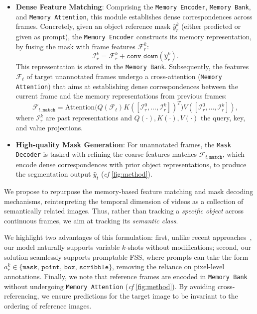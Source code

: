 \begin{itemize}[leftmargin=*,topsep=1pt]
    \item \textbf{Dense Feature Matching}: Comprising the \texttt{Memory Encoder}, \texttt{Memory Bank}, and \texttt{Memory Attention}, this module establishes dense correspondences across frames. Concretely, given an object reference mask $\hat{y}_r^k$ (either predicted or given as prompt), the \texttt{Memory Encoder} constructs its memory representation, by fusing the mask with frame features $\mathcal{F}_r^k$:
\begin{equation}
    \mathcal{I}_r^k = \mathcal{F}_r^k + \texttt{conv\_down}(\hat{y}_r^k).
    \label{eq:mem_representation}
\end{equation}
This representation is stored in the \texttt{Memory Bank}. Subsequently, the features $\mathcal{F}_t$ of target unannotated frames undergo a cross-attention (\texttt{Memory Attention}) that aims at establishing dense correspondences between the current frame and the memory representations from previous frames:
\begin{equation}
\label{eq:mem_att}
\mathcal{F}_{t, \texttt{match}} = \text{Attention} \big( Q(\mathcal{F}_t) K([\mathcal{I}_r^0, ..., \mathcal{I}_r^{k}])^T \big) V([\mathcal{I}_r^0, ..., \mathcal{I}_r^{k}]),
\end{equation}
where \( \mathcal{I}_r^k \) are past representations and \( Q(\cdot), K(\cdot), V(\cdot) \) the query, key, and value projections.
    \item \textbf{High-quality Mask Generation}: For unannotated frames, the \texttt{Mask Decoder} is tasked with refining the coarse features matches $\mathcal{F}_{t, \texttt{match}}$, which encode dense correspondences with prior object representations, to produce the segmentation output $\hat{y}_t$ (\textit{cf} \cref{fig:method}). 
\end{itemize}

We propose to repurpose the memory-based feature matching and mask decoding mechanisms, reinterpreting the temporal dimension of videos as a collection of semantically related images. Thus, rather than tracking a \textit{specific object} across continuous frames, we aim at tracking its \textit{semantic class}.




We highlight two advantages of this formulation: first, unlike recent approaches~\cite{sun2024vrp, meng2024segic, zhu2024unleashing}, our model naturally supports variable $k$-shots without modifications; second, our solution seamlessly supports promptable FSS, where prompts can take the form $a_r^k \in \big\{ \texttt{mask, point, box, scribble} \big\}$, removing the reliance on pixel-level annotations. Finally, we note that reference frames are encoded in \texttt{Memory Bank} without undergoing \texttt{Memory Attention} (\textit{cf} \cref{fig:method}). By avoiding cross-referencing, we ensure predictions for the target image to be invariant to the ordering of reference images.

